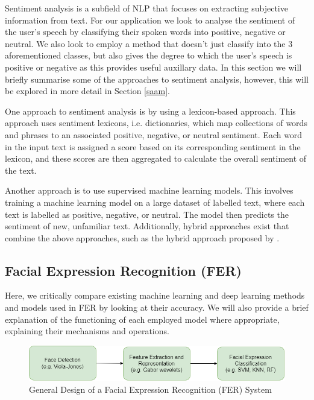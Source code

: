 \documentclass[12pt, a4paper]{article}
\newcommand{\np}
    {
    \vskip 0.4cm
    }
\begin{document}
Sentiment analysis is a subfield of NLP that focuses on extracting subjective information from text. For our application we look to analyse the sentiment of the user's speech by classifying their spoken words into positive, negative or neutral. We also look to employ a method that doesn't just classify into the 3 aforementioned classes, but also gives the degree to which the user's speech is positive or negative as this provides useful auxillary data. In this section we will briefly summarise some of the approaches to sentiment analysis, however, this will be explored in more detail in Section \ref{saam}.
\np
One approach to sentiment analysis is by using a lexicon-based approach. This approach uses sentiment lexicons, i.e. dictionaries, which map collections of words and phrases to an associated positive, negative, or neutral sentiment. Each word in the input text is assigned a score based on its corresponding sentiment in the lexicon, and these scores are then aggregated to calculate the overall sentiment of the text.
\np
Another approach is to use supervised machine learning models. This involves training a machine learning model on a large dataset of labelled text, where each text is labelled as positive, negative, or neutral. The model then predicts the sentiment of new, unfamiliar text. Additionally, hybrid approaches exist that combine the above approaches, such as the hybrid approach proposed by \cite{appel2018successes}.

\subsection{Facial Expression Recognition (FER)}
\label{fer}
Here, we critically compare existing machine learning and deep learning methods and models used in FER by looking at their accuracy. We will also provide a brief explanation of the functioning of each employed model where appropriate, explaining their mechanisms and operations.
\np

\begin{figure}[H]
    \centering
    \includegraphics[scale=0.50]{diagrams/fersystem.png}
    \caption{General Design of a Facial Expression Recognition (FER) System}
    \label{fig:fersystem}
\end{figure}
\end{document}
